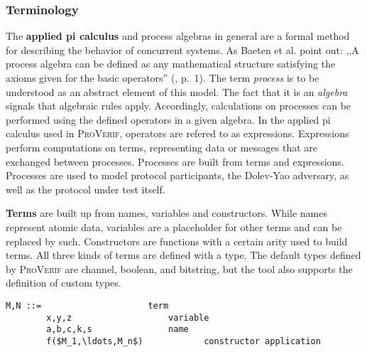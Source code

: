 \subsubsection{Terminology}

The \textbf{applied pi calculus} and process algebras in general are a formal method for describing the behavior of concurrent systems.
As Baeten et al. point out: ,,A process algebra can be defined as any mathematical structure satisfying the axioms given for the basic operators'' (\cite{baeten2007process}, p.~1).
The term \textit{process} is to be understood as an abstract element of this model.
The fact that it is an \textit{algebra} signals that algebraic rules apply.
Accordingly, calculations on processes can be performed using the defined operators in a given algebra.
In the applied pi calculus used in \textsc{ProVerif}, operators are refered to as expressions.
Expressions perform computations on terms, representing data or messages that are exchanged between processes.
Processes are built from terms and expressions.
Processes are used to model protocol participants, the Dolev-Yao adversary, as well as the protocol under test itself.

\textbf{Terms} are built up from names, variables and constructors.
While names represent atomic data, variables are a placeholder for other terms and can be replaced by such.
Constructors are functions with a certain arity used to build terms.
All three kinds of terms are defined with a type.
The default types defined by \textsc{ProVerif} are \textsf{channel}, \textsf{boolean}, and \textsf{bitstring}, but the tool also supports the definition of custom types.


\begin{lstlisting}[caption={ProVerif term grammar, according to \cite{blanchet2016modeling}, p.~13},label={lst:pv-terms}]
    M,N ::=                     term
        x,y,z                   variable
        a,b,c,k,s               name
        f($M_1,\ldots,M_n$)            constructor application
\end{lstlisting}


